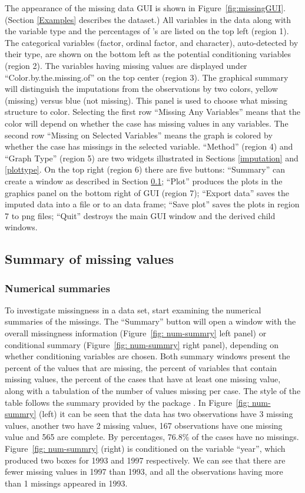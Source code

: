\documentclass[article]{jss}
\begin{document}
The appearance of the missing data GUI is shown in Figure~\ref{fig:missingGUI}. (Section \ref{Examples} describes the dataset.) All variables in the data along with the variable type and the percentages of 's are listed on the top left (region 1). The categorical variables (factor, ordinal factor, and character), auto-detected by their type, are shown on the bottom left as the potential conditioning variables (region 2). The variables having missing values are displayed under ``Color.by.the.missing.of'' on the top center (region 3). The graphical summary will distinguish the imputations from the observations by two colors, yellow (missing) versus blue (not missing). This panel is used to choose what missing structure to color. Selecting the first row ``Missing Any Variables'' means that the color will depend on whether the case has missing values in any variables. The second row ``Missing on Selected Variables'' means the graph is colored by whether the case has missings in the selected variable. ``Method'' (region 4) and ``Graph Type'' (region 5) are two widgets illustrated in Sections \ref{imputation} and \ref{plottype}. On the top right (region 6) there are five buttons: ``Summary'' can create a window as described in Section \ref{numsum}; ``Plot'' produces the plots in the graphics panel on the bottom right of GUI (region 7); ``Export data'' saves the imputed data into a file or to an  data frame; ``Save plot'' saves the plots in region 7 to png files; ``Quit'' destroys the main GUI window and the derived child windows.

\subsection{Summary of missing values}\label{numsum}

\subsubsection{Numerical summaries}
To investigate missingness in a data set, start examining the numerical summaries of the missings. The ``Summary'' button will open a window with the overall missingness information (Figure~\ref{fig: num-summry} left panel) or conditional summary (Figure~\ref{fig: num-summry} right panel), depending on whether conditioning variables are chosen. Both summary windows present the percent of the values that are missing, the percent of variables that contain missing values, the percent of the cases that have at least one missing value, along with a tabulation of the number of values missing per case. The style of the table follows the summary provided by the package .  In Figure~\ref{fig: num-summry} (left) it can be seen that the data has two observations have 3 missing values, another two have 2 missing values, 167 observations have one missing value and 565 are complete. By percentages, 76.8\% of the cases have no missings. Figure~\ref{fig: num-summry} (right) is conditioned on the variable ``year'', which produced two boxes for 1993 and 1997 respectively. We can see that there are fewer missing values in 1997 than 1993, and all the observations having more than 1 missings appeared in 1993.
\end{document}
